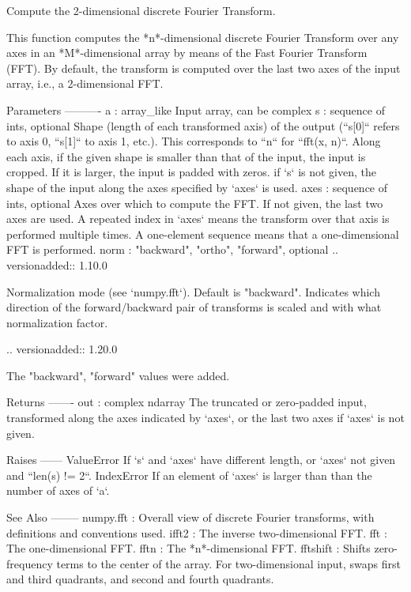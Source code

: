\begin{DoxyVerb}Compute the 2-dimensional discrete Fourier Transform.

This function computes the *n*-dimensional discrete Fourier Transform
over any axes in an *M*-dimensional array by means of the
Fast Fourier Transform (FFT).  By default, the transform is computed over
the last two axes of the input array, i.e., a 2-dimensional FFT.

Parameters
----------
a : array_like
    Input array, can be complex
s : sequence of ints, optional
    Shape (length of each transformed axis) of the output
    (``s[0]`` refers to axis 0, ``s[1]`` to axis 1, etc.).
    This corresponds to ``n`` for ``fft(x, n)``.
    Along each axis, if the given shape is smaller than that of the input,
    the input is cropped.  If it is larger, the input is padded with zeros.
    if `s` is not given, the shape of the input along the axes specified
    by `axes` is used.
axes : sequence of ints, optional
    Axes over which to compute the FFT.  If not given, the last two
    axes are used.  A repeated index in `axes` means the transform over
    that axis is performed multiple times.  A one-element sequence means
    that a one-dimensional FFT is performed.
norm : {"backward", "ortho", "forward"}, optional
    .. versionadded:: 1.10.0

    Normalization mode (see `numpy.fft`). Default is "backward".
    Indicates which direction of the forward/backward pair of transforms
    is scaled and with what normalization factor.

    .. versionadded:: 1.20.0

        The "backward", "forward" values were added.

Returns
-------
out : complex ndarray
    The truncated or zero-padded input, transformed along the axes
    indicated by `axes`, or the last two axes if `axes` is not given.

Raises
------
ValueError
    If `s` and `axes` have different length, or `axes` not given and
    ``len(s) != 2``.
IndexError
    If an element of `axes` is larger than than the number of axes of `a`.

See Also
--------
numpy.fft : Overall view of discrete Fourier transforms, with definitions
     and conventions used.
ifft2 : The inverse two-dimensional FFT.
fft : The one-dimensional FFT.
fftn : The *n*-dimensional FFT.
fftshift : Shifts zero-frequency terms to the center of the array.
    For two-dimensional input, swaps first and third quadrants, and second
    and fourth quadrants.


\end{DoxyVerb}
